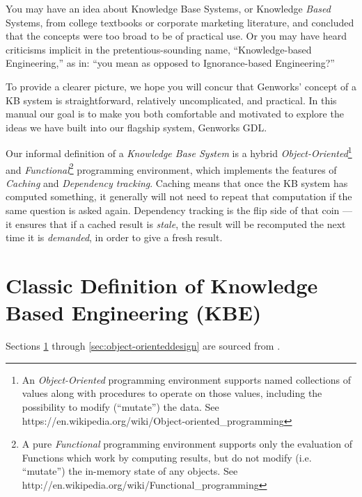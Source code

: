 \documentclass [11pt]{book}
\begin{document}
\label{sec:knowledgebaseconceptsaccordingtogenworks}

You may have an idea about Knowledge Base Systems,
or Knowledge \emph{Based} Systems, from college textbooks or corporate marketing
literature, and concluded that the concepts were too broad to be of
practical use. Or you may have heard criticisms implicit in the
pretentious-sounding name, ``Knowledge-based Engineering,'' as in:
``you mean as opposed to Ignorance-based Engineering?'' 

To provide a clearer picture, we hope you will concur that Genworks'
concept of a KB system is straightforward, relatively uncomplicated,
and practical. In this manual our goal is to make you both comfortable
and motivated to explore the ideas we have built into our flagship
system, Genworks GDL.

Our informal definition of a \emph{Knowledge Base System} is a hybrid \emph{Object-Oriented}\footnote{An \emph{Object-Oriented} programming environment supports named collections
		  of values along with procedures to operate on those
		  values, including the possibility to
		  modify (``mutate'') the data. See
		  https://en.wikipedia.org/wiki/Object-oriented\_programming} and \emph{Functional}\footnote{A pure \emph{Functional} programming environment supports only the
evaluation of Functions which work by computing results, but do not
modify (i.e. ``mutate'') the in-memory state of any objects. See
http://en.wikipedia.org/wiki/Functional\_programming} programming environment, which implements the features of \emph{Caching} and \emph{Dependency tracking}. Caching means that once the KB system has computed
something, it generally will not need to repeat that computation if
the same question is asked again. Dependency tracking is the flip side
of that coin --- it ensures that if a cached result is \emph{stale}, the result will be recomputed the next time it is \emph{demanded}, in order to give a fresh result.

\section{Classic Definition of Knowledge Based Engineering (KBE)}

\label{sec:classicdefinitionofknowledgebasedengineering(kbe)}

Sections 
\ref{sec:classicdefinitionofknowledgebasedengineering(kbe)} through 
\ref{sec:object-orienteddesign} are sourced from 
\cite{LaRocca}.
\end{document}
